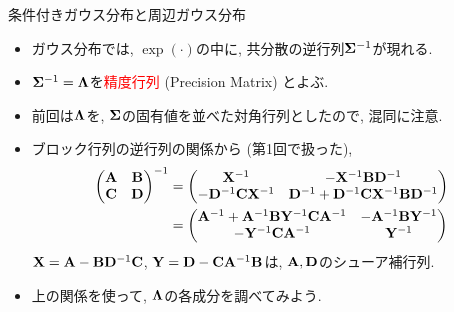 \documentclass[dvipdfmx,notheorems,t]{beamer}
\begin{document}
\begin{frame}{条件付きガウス分布と周辺ガウス分布}
\begin{itemize}
  \item ガウス分布では, $\exp(\cdot)$の中に, 共分散の逆行列$\vb{\Sigma}^{-1}$が現れる.
  \item $\vb{\Sigma}^{-1} = \vb{\Lambda}$を\textcolor{red}{精度行列} (Precision Matrix) とよぶ.
  \item 前回は$\vb{\Lambda}$を, $\vb{\Sigma}$の固有値を並べた対角行列としたので, 混同に注意.
  \item ブロック行列の逆行列の関係から (第1回で扱った),
  \begin{align*}
    \mqty(\vb{A} & \vb{B} \\ \vb{C} & \vb{D})^{-1}
    &= \mqty(\vb{X}^{-1} & -\vb{X}^{-1} \vb{B} \vb{D}^{-1} \\
      -\vb{D}^{-1} \vb{C} \vb{X}^{-1}
      & \vb{D}^{-1} + \vb{D}^{-1} \vb{C} \vb{X}^{-1} \vb{B} \vb{D}^{-1}) \\
    &= \mqty(\vb{A}^{-1} + \vb{A}^{-1} \vb{B} \vb{Y}^{-1} \vb{C} \vb{A}^{-1}
      & -\vb{A}^{-1} \vb{B} \vb{Y}^{-1} \\
      -\vb{Y}^{-1} \vb{C} \vb{A}^{-1} & \vb{Y}^{-1})
  \end{align*}
  $\vb{X} = \vb{A} - \vb{B} \vb{D}^{-1} \vb{C}$, $\vb{Y} = \vb{D} - \vb{C} \vb{A}^{-1} \vb{B}$は,
  $\vb{A}, \vb{D}$のシューア補行列.
  \item 上の関係を使って, $\vb{\Lambda}$の各成分を調べてみよう.
\end{itemize}
\end{frame}
\end{document}
